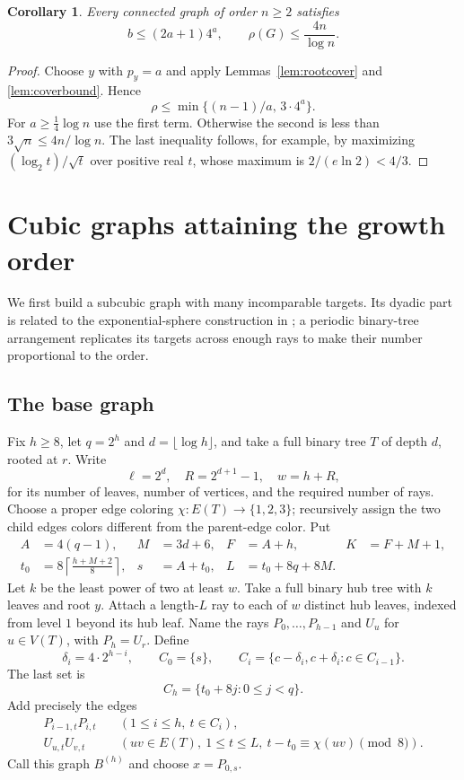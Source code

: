 \documentclass[11pt]{article}
\newtheorem{corollary}[theorem]{Corollary}
\theoremstyle{remark}\newtheorem{remark}[theorem]{Remark}
\begin{document}
\begin{corollary}\label{cor:upper}
Every connected graph of order $n\ge2$ satisfies
\begin{equation}\label{eq:universal}
 b\le(2a+1)4^a,\qquad \rho(G)\le\frac{4n}{\log n}.
\end{equation}
\end{corollary}
\begin{proof}
Choose $y$ with $p_y=a$ and apply Lemmas~\ref{lem:rootcover} and
\ref{lem:coverbound}. Hence
\[
 \rho\le\min\{(n-1)/a,\,3\cdot4^a\}.
\]
For $a\ge\frac14\log n$ use the first term. Otherwise the second is less than
$3\sqrt n\le4n/\log n$. The last inequality follows, for example, by maximizing
$(\log_2 t)/\sqrt t$ over positive real $t$, whose maximum is $2/(e\ln2)<4/3$.
\end{proof}

\section{Cubic graphs attaining the growth order}
We first build a subcubic graph with many incomparable targets. Its dyadic
part is related to the exponential-sphere construction in
\cite[Figure 7]{cover}; a periodic binary-tree arrangement replicates its
targets across enough rays to make their number proportional to the order.

\subsection{The base graph}
Fix $h\ge8$, let $q=2^h$ and $d=\lfloor\log h\rfloor$, and take a full binary
tree $T$ of depth $d$, rooted at $r$. Write
\[
 \ell=2^d,\quad R=2^{d+1}-1,\quad w=h+R,
\]
for its number of leaves, number of vertices, and the required number of rays.
Choose a proper edge coloring $\chi:E(T)\to\{1,2,3\}$; recursively assign the
two child edges colors different from the parent-edge color. Put
\begin{align*}
 A&=4(q-1),& M&=3d+6,& F&=A+h,& K&=F+M+1,\\
 t_0&=8\left\lceil\frac{h+M+2}{8}\right\rceil,
 &s&=A+t_0,&L&=t_0+8q+8M.
\end{align*}
Let $k$ be the least power of two at least $w$. Take a full binary hub tree
with $k$ leaves and root $y$. Attach a length-$L$ ray to each of $w$ distinct
hub leaves, indexed from level $1$ beyond its hub leaf. Name the rays
$P_0,\ldots,P_{h-1}$ and $U_u$ for $u\in V(T)$, with $P_h=U_r$.
Define
\[
 \delta_i=4\cdot2^{h-i},\qquad C_0=\{s\},\qquad
 C_i=\{c-\delta_i,c+\delta_i:c\in C_{i-1}\}.
\]
The last set is
\begin{equation}\label{eq:centers}
 C_h=\{t_0+8j:0\le j<q\}.
\end{equation}
Add precisely the edges
\begin{align}
 P_{i-1,t}P_{i,t}&\quad(1\le i\le h,\ t\in C_i),\label{eq:dyadicedges}\\
 U_{u,t}U_{v,t}&\quad(uv\in E(T),\ 1\le t\le L,\ t-t_0\equiv\chi(uv)\pmod8).\label{eq:treeedges}
\end{align}
Call this graph $B^{(h)}$ and choose $x=P_{0,s}$.
\end{document}
